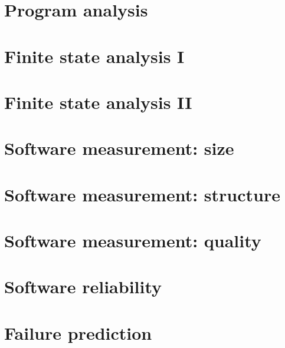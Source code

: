 \chapter{Program analysis}

\chapter{Finite state analysis I}

\chapter{Finite state analysis II}

\chapter{Software measurement: size}

\chapter{Software measurement: structure}

\chapter{Software measurement: quality}

\chapter{Software reliability}

\chapter{Failure prediction}

